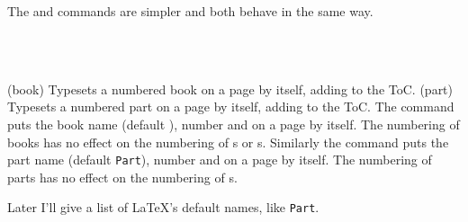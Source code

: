     The \cmd{\book} and \cmd{\part} commands are simpler and both behave 
in the same way.
\begin{syntax}
\cmd{\book} \\
\cmd{\part} \\
\end{syntax}
\glossary(book)%
  {}%
  {Typesets a numbered book  on a page by itself, adding
    to the ToC.}
\glossary(part)%
  {}%
  {Typesets a numbered part  on a page by itself, adding
    to the ToC.}
The \cmd{\book} command puts the book name (default 
\texttt{\bookname}), number and  on a page by itself. The
numbering of books has no effect on the numbering of 
\cmd{\part}s or \cmd{\chapter}s.
Similarly the \cmd{\part} command puts the part name 
(default \texttt{Part}), number and  on a page by itself. 
The numbering of parts has no effect on the numbering of 
\cmd{\chapter}s.

    Later I'll give a list of LaTeX's default names, like \texttt{Part}.

